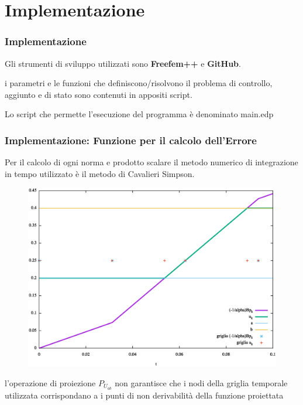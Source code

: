 \documentclass{beamer}
\theoremstyle{definition}
\theoremstyle{remark}
\theoremstyle{plain}
\theoremstyle{definition}
\begin{document}
\section{Implementazione}
\begin{frame}
\frametitle{Implementazione}
Gli strumenti di sviluppo utilizzati sono \textbf{Freefem++} e \textbf{GitHub}.
\par\bigskip
i parametri e le funzioni che definiscono/risolvono il problema di controllo, aggiunto e di stato sono contenuti in appositi script.
\par\bigskip
Lo script che permette l'esecuzione del programma è denominato main.edp

\end{frame}
\frametitle{Implementazione: Funzione per il calcolo dell'Errore}
\begin{frame}

Per il calcolo di ogni norma e prodotto scalare il metodo numerico di integrazione in tempo utilizzato è il metodo di Cavalieri Simpson.

\begin{figure}
\centering
\includegraphics[scale=0.25]{img/cap5/griglie}
\label{fig:griglie}
\end{figure}

l'operazione di proiezione $P_{U_{ab}}$ non garantisce che i nodi della griglia temporale utilizzata corrispondano a i punti di non derivabilità della funzione proiettata

\end{frame}
\end{document}
